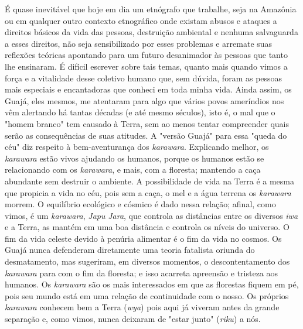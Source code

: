 É quase inevitável que hoje em dia um etnógrafo que trabalhe, seja na
Amazônia ou em qualquer outro contexto etnográfico onde existam abusos e
ataques a direitos básicos da vida das pessoas, destruição ambiental e
nenhuma salvaguarda a esses direitos, não seja sensibilizado por esses
problemas e arremate suas reflexões teóricas apontando para um futuro
desanimador às pessoas que tanto lhe ensinaram. É difícil escrever sobre
tais temas, quanto mais quando vimos a força e a vitalidade desse
coletivo humano que, sem dúvida, foram as pessoas mais especiais e
encantadoras que conheci em toda minha vida. Ainda assim, os Guajá, eles
mesmos, me atentaram para algo que vários povos ameríndios nos vêm
alertando há tantas décadas (e até mesmo séculos), isto é, o mal que o
"homem branco" tem causado à Terra, sem ao menos tentar compreender
quais serão as consequências de suas atitudes. A "versão Guajá" para
essa "queda do céu" diz respeito à bem-aventurança dos \emph{karawara}.
Explicando melhor, os \emph{karawara} estão vivos ajudando os humanos,
porque os humanos estão se relacionando com os \emph{karawara}, e mais,
com a floresta; mantendo a caça abundante sem destruir o ambiente. A
possibilidade de vida na Terra é a mesma que propicia a vida no céu,
pois sem a caça, o mel e a água terrena os \emph{karawara} morrem. O
equilíbrio ecológico e cósmico é dado nessa relação; afinal, como vimos,
é um \emph{karawara}, \emph{Japu} \emph{Jara}, que controla as
distâncias entre os diversos \emph{iwa} e a Terra, as mantém em uma boa
distância e controla os níveis do universo. O fim da vida celeste devido
à penúria alimentar é o fim da vida no cosmos. Os Guajá nunca defenderam
diretamente uma teoria fatalista oriunda do desmatamento, mas sugeriram,
em diversos momentos, o descontentamento dos \emph{karawara} para com o
fim da floresta; e isso acarreta apreensão e tristeza aos humanos. Os
\emph{karawara} são os mais interessados em que as florestas fiquem em
pé, pois seu mundo está em uma relação de continuidade com o nosso. Os
próprios \emph{karawara} conhecem bem a Terra (\emph{wya}) pois aqui já
viveram antes da grande separação e, como vimos, nunca deixaram de
"estar junto" (\emph{riku}) a nós.
